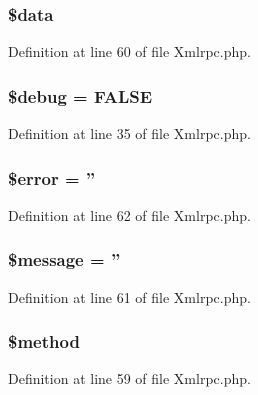 \subsubsection[{\$data}]{\setlength{\rightskip}{0pt plus 5cm}\$data}\label{class_c_i___xmlrpc_a6efc15b5a2314dd4b5aaa556a375c6d6}


Definition at line 60 of file Xmlrpc.\-php.

\subsubsection[{\$debug}]{\setlength{\rightskip}{0pt plus 5cm}\$debug = F\-A\-L\-S\-E}\label{class_c_i___xmlrpc_a85ae3e64cd40e9564adceb010085e9dd}


Definition at line 35 of file Xmlrpc.\-php.

\subsubsection[{\$error}]{\setlength{\rightskip}{0pt plus 5cm}\$error = ''}\label{class_c_i___xmlrpc_aeba2ab722cedda53dbb7ec1a59f45550}


Definition at line 62 of file Xmlrpc.\-php.

\subsubsection[{\$message}]{\setlength{\rightskip}{0pt plus 5cm}\$message = ''}\label{class_c_i___xmlrpc_abf17cb2dba2ed17cb28aa5f37deb5293}


Definition at line 61 of file Xmlrpc.\-php.

\subsubsection[{\$method}]{\setlength{\rightskip}{0pt plus 5cm}\${\bf method}}\label{class_c_i___xmlrpc_a12661b2fc0f57f97e30a1620889ce9c6}


Definition at line 59 of file Xmlrpc.\-php.

